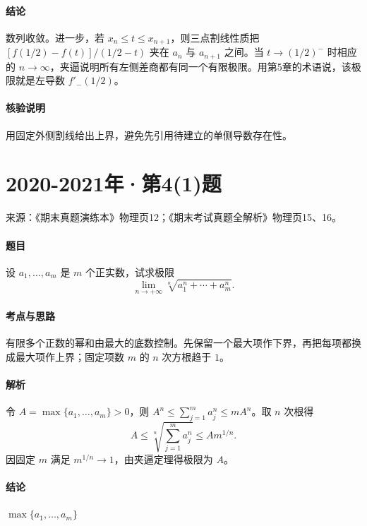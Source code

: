 \documentclass[UTF8,fontset=fandol,12pt,oneside,openany]{ctexrep}
\theoremstyle{definition}
\begin{document}
\paragraph{结论}
数列收敛。进一步，若 $x_n\le t\le x_{n+1}$，则三点割线性质把 $[f(1/2)-f(t)]/(1/2-t)$ 夹在 $a_n$ 与 $a_{n+1}$ 之间。当 $t\to(1/2)^-$ 时相应的 $n\to\infty$，夹逼说明所有左侧差商都有同一个有限极限。用第5章的术语说，该极限就是左导数 $f'_-(1/2)$。

\paragraph{核验说明}
用固定外侧割线给出上界，避免先引用待建立的单侧导数存在性。

\par\addvspace{18pt}\noindent\begin{minipage}{\linewidth}
\section{2020-2021年·第4(1)题}
\noindent 来源：《期末真题演练本》物理页12；《期末考试真题全解析》物理页15、16。

\paragraph{题目}
设 $a_1,\ldots,a_m$ 是 $m$ 个正实数，试求极限 \[
\lim_{n\to+\infty}\sqrt[n]{a_1^n+\cdots+a_m^n}.
\]
\end{minipage}\par
\paragraph{考点与思路}
有限多个正数的幂和由最大的底数控制。先保留一个最大项作下界，再把每项都换成最大项作上界；固定项数 $m$ 的 $n$ 次方根趋于 $1$。

\paragraph{解析}
令 $A=\max\{a_1,\ldots,a_m\}>0$，则 $A^n\le\sum_{j=1}^m a_j^n\le mA^n$。取 $n$ 次根得 \[
A\le\sqrt[n]{\sum_{j=1}^m a_j^n}\le A m^{1/n}.
\]因固定 $m$ 满足 $m^{1/n}\to1$，由夹逼定理得极限为 $A$。

\paragraph{结论}
$\max\{a_1,\ldots,a_m\}$
\end{document}
